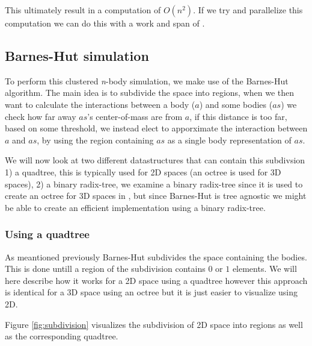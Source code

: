 This ultimately result in a computation of $O(n^2)$.
If we try and parallelize this computation we can do this with a work and span of .

\subsection{Barnes-Hut simulation}
To perform this clustered \textit{n}-body simulation, we make use of the
Barnes-Hut algorithm\cite{BH-algo}. The main idea is to subdivide the space into
regions, when we then want to calculate the interactions between a body ($a$)
and some bodies ($as$) we check how far away $as$'s center-of-mass are from $a$,
if this distance
is too far, based on some threshold, we instead elect to apporximate the
interaction between $a$ and $as$, by using the region containing $as$ as a
single body representation of $as$.

We will now look at two different datastructures that can contain this subdivsion
1) a quadtree, this is typically used for 2D spaces (an octree is used for 3D
spaces), 2) a binary radix-tree, we examine a binary radix-tree since it is used
to create an octree for 3D spaces in \cite{main-ref}, but since Barnes-Hut is
tree agnostic we might be able to create an efficient implementation using a
binary radix-tree.

\subsubsection{Using a quadtree}
As meantioned previously Barnes-Hut subdivides the space containing the bodies.
This is done untill a region of the subdivision contains $0$ or $1$ elements.
We will here describe how it works for a 2D space using a quadtree however this
approach is identical for a 3D space using an octree but it is just easier to
visualize using 2D.

Figure \ref{fig:subdivision} visualizes the subdivision of 2D space into regions
as well as the corresponding quadtree.


